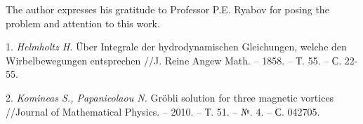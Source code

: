 The author expresses his gratitude to Professor P.E. Ryabov for posing the problem and attention to this work.

\litlist

1. {\it Helmholtz H.}
  \"{U}ber Integrale der hydrodynamischen Glei\-chun\-gen, welche den Wirbelbewegungen entsprechen //J. Reine Angew Math. -- 1858. -- Т. 55. -- С. 22-55.

2. {\it Komineas S., Papanicolaou N.}
 Gr\"{o}bli solution for three magnetic vortices //Journal of Mathematical Physics. -- 2010. -- Т. 51. -- №. 4. -- С. 042705.
%
%



